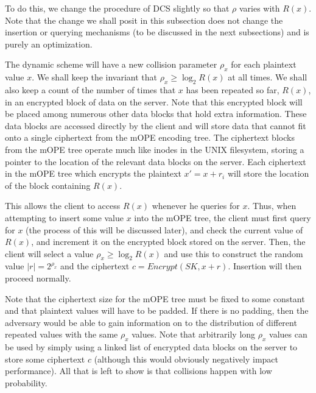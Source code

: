 \documentclass[12pt]{article}
\begin{document}
To do this, we change the procedure of DCS slightly so that $\rho$ varies with $R(x)$. Note that the change we shall posit in this subsection does not change the insertion or querying mechanisms (to be discussed in the next subsections) and is purely an optimization.

The dynamic scheme will have a new collision parameter $\rho_x$ for each plaintext value $x$. We shall keep the invariant that $\rho_x \geq \log_2 R(x)$ at all times. We shall also keep a count of the number of times that $x$ has been repeated so far, $R(x)$, in an encrypted block of data on the server. Note that this encrypted block will be placed among numerous other data blocks that hold extra information. These data blocks are accessed directly by the client and will store data that cannot fit onto a single ciphertext from the mOPE encoding tree. The ciphertext blocks from the mOPE tree operate much like inodes in the UNIX filesystem, storing a pointer to the location of the relevant data blocks on the server. Each ciphertext in the mOPE tree which encrypts the plaintext $x' = x + r_i$ will store the location of the block containing $R(x)$.

This allows the client to access $R(x)$ whenever he queries for $x$. Thus, when attempting to insert some value $x$ into the mOPE tree, the client must first query for $x$ (the process of this will be discussed later), and check the current value of $R(x)$, and increment it on the encrypted block stored on the server. Then, the client will select a value $\rho_x \geq \log_2 R(x)$ and use this to construct the random value $|r| = 2^{\rho_x}$ and the ciphertext $c = Encrypt(SK, x + r)$. Insertion will then proceed normally.

Note that the ciphertext size for the mOPE tree must be fixed to some constant and that plaintext values will have to be padded. If there is no padding, then the adversary would be able to gain information on to the distribution of different repeated values with the same $\rho_x$ values. Note that arbitrarily long $\rho_x$ values can be used by simply using a linked list of encrypted data blocks on the server to store some ciphertext $c$ (although this would obviously negatively impact performance). All that is left to show is that collisions happen with low probability. \\
\end{document}
